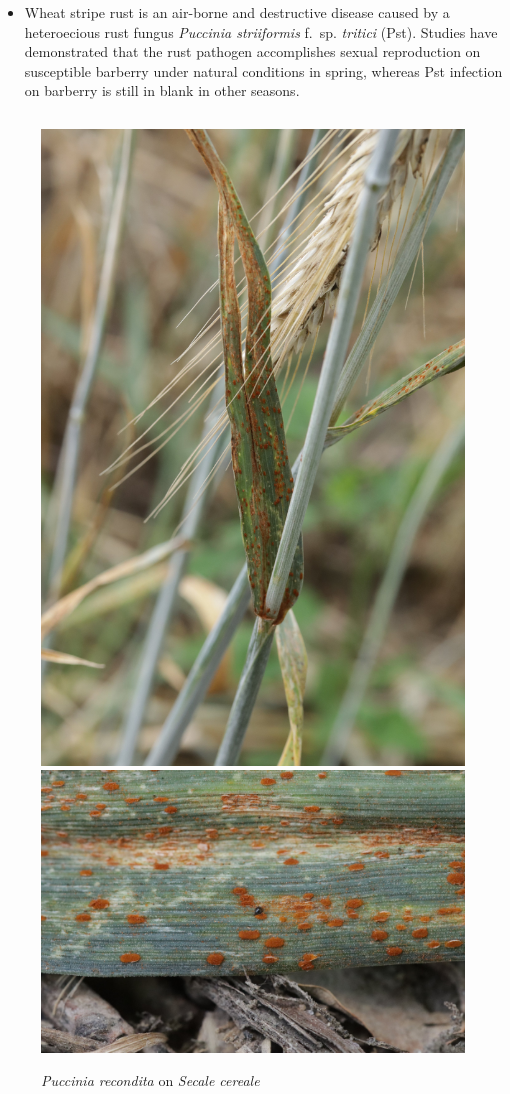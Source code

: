 \documentclass[10pt,dvipsnames,ignorenonframetext,aspectratio=169]{beamer}
\providecommand{\tightlist}{%
  \setlength{\itemsep}{0pt}\setlength{\parskip}{0pt}}
\begin{document}
\begin{frame}{}
\begin{figure}
\begin{columns}
\end{columns}\end{figure}

\footnotesize

\begin{itemize}
\tightlist
\item
  Wheat stripe rust is an air-borne and destructive disease caused by a
  heteroecious rust fungus \textit{Puccinia striiformis }f.~sp.
  \textit{tritici} (Pst). Studies have demonstrated that the rust
  pathogen accomplishes sexual reproduction on susceptible barberry
  under natural conditions in spring, whereas Pst infection on barberry
  is still in blank in other seasons.
\end{itemize}
\end{frame}

\begin{frame}{}
\protect\hypertarget{section-12}{}
\begin{figure}\caption{\textit{Puccinia recondita} on \textit{Secale cereale}} 
\begin{columns}\includegraphics[width=0.72\linewidth]{../images/FYCo7NmWQAkXvRB}\includegraphics[width=0.6\linewidth]{../images/FYCo7NwXgAYe9r1} \\ 

\end{columns}
\end{figure}
\end{frame}
\end{document}
